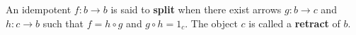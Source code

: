 An idempotent $f: b \rightarrow b$ is said to \textbf{split} when there exist arrows $g: b \rightarrow c$ and $h: c \rightarrow b$ such that $f = h \circ g$ and $g \circ h = 1_c$. The object $c$ is called a \textbf{retract} of $b$.